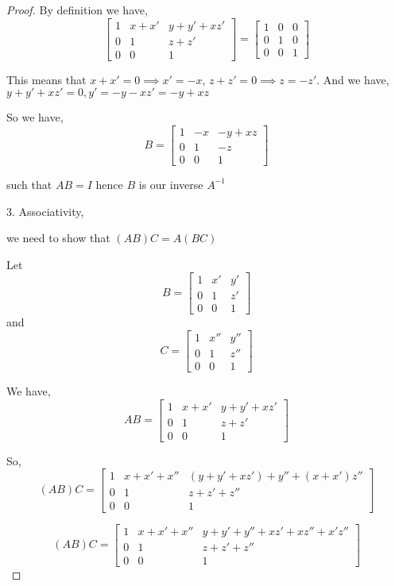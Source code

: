 \documentclass[a4paper]{report}
\begin{document}
\begin{proof}
    By definition we have, 
    $$  \begin{bmatrix} 1 & x + x' & y + y' + xz'  \\ 0 & 1 & z + z' \\ 0 & 0 & 1\end{bmatrix}   =  \begin{bmatrix} 1 & 0 & 0  \\ 0 & 1 & 0 \\ 0 & 0 & 1\end{bmatrix} $$ 

    This means that $x + x' = 0 \implies x' = -x$,  $z + z' = 0 \implies z = -z'$. And we have,  $y + y' + xz' = 0, y' = -y - xz' = -y + xz$

    So we have,  
    $$ B = \begin{bmatrix} 1 &- x & - y + xz  \\ 0 & 1 & -z  \\ 0 & 0 & 1\end{bmatrix} $$ 


    such that $AB = I$ hence  $B$ is our inverse $A^{-1}$ 


    3. Associativity, 

    we need to show that $(AB)C = A(BC)$

    Let  $$B = \begin{bmatrix} 1 & x' & y'  \\ 0 & 1 & z' \\ 0 & 0 & 1\end{bmatrix}$$ and 
 $$C = \begin{bmatrix} 1 & x'' & y''  \\ 0 & 1 & z'' \\ 0 & 0 & 1\end{bmatrix}$$

 We have, 
 $$ AB = \begin{bmatrix} 1 & x + x' & y + y' + xz'  \\ 0 & 1 & z + z' \\ 0 & 0 & 1\end{bmatrix} $$ 

So, $$(AB)C = \begin{bmatrix} 1 & x + x' + x'' & (y + y' + xz') + y'' +(x + x')z''  \\ 0 & 1 & z + z' + z'' \\ 0 & 0 & 1\end{bmatrix} $$

$$(AB)C = \begin{bmatrix} 1 & x + x' + x'' & y + y' + y''  + xz'  +xz'' + x'z''  \\ 0 & 1 & z + z' + z'' \\ 0 & 0 & 1\end{bmatrix} $$


\end{proof}
\end{document}
